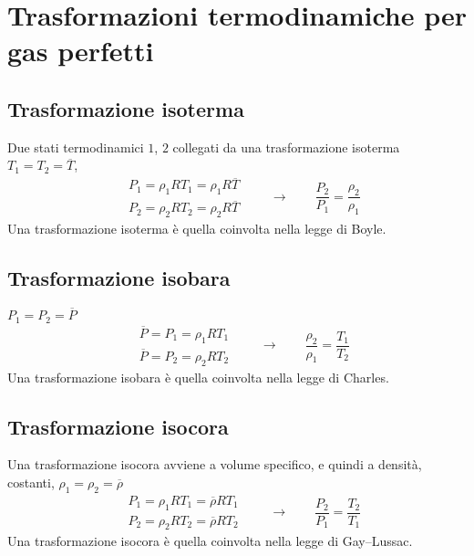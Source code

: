 \section{Trasformazioni termodinamiche per gas perfetti}
\subsection{Trasformazione isoterma} Due stati termodinamici $1$, $2$ collegati da una trasformazione isoterma $T_1 = T_2 = \overline{T}$, 
\begin{equation}
\begin{aligned}
  & P_1 = \rho_1 R T_1 = \rho_1 R \overline{T} \\
  & P_2 = \rho_2 R T_2 = \rho_2 R \overline{T}
\end{aligned} \qquad \rightarrow \qquad 
  \dfrac{P_2}{P_1} = \dfrac{\rho_2}{\rho_1}
\end{equation}
Una trasformazione isoterma è quella coinvolta nella legge di Boyle.
\subsection{Trasformazione isobara} $P_1 = P_2 = \overline{P}$
\begin{equation}
\begin{aligned}
    & \overline{P} = P_1 = \rho_1 R T_1 \\
    & \overline{P} = P_2 = \rho_2 R T_2
\end{aligned} \qquad \rightarrow \qquad 
    \dfrac{\rho_2}{\rho_1} = \dfrac{T_1}{T_2}
\end{equation}
Una trasformazione isobara è quella coinvolta nella legge di Charles.
\subsection{Trasformazione isocora} Una trasformazione isocora avviene a volume specifico, e quindi a densità, costanti, $\rho_1 = \rho_2 = \overline{\rho}$
\begin{equation}
\begin{aligned}
    & P_1 = \rho_1 R T_1  = \overline{\rho} R T_1 \\
    & P_2 = \rho_2 R T_2  = \overline{\rho} R T_2
\end{aligned} \qquad \rightarrow \qquad 
    \dfrac{P_2}{P_1} = \dfrac{T_2}{T_1}
\end{equation}
Una trasformazione isocora è quella coinvolta nella legge di Gay--Lussac.

